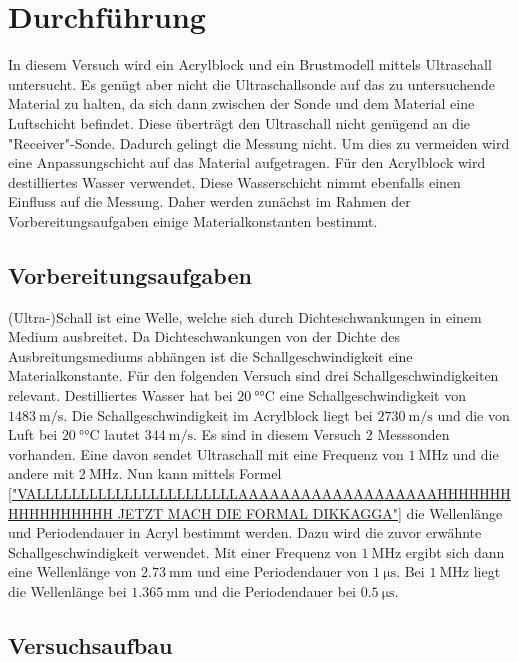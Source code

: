 \section{Durchführung}
\label{sec:Durchführung}
In diesem Versuch wird ein Acrylblock und ein Brustmodell mittels Ultraschall untersucht. Es genügt aber nicht die Ultraschallsonde auf das zu untersuchende Material zu halten, da sich dann
zwischen der Sonde und dem Material eine Luftschicht befindet. Diese überträgt den Ultraschall nicht genügend an die "Receiver"-Sonde. Dadurch gelingt die Messung nicht. Um dies zu vermeiden
wird eine Anpassungschicht auf das Material aufgetragen. Für den Acrylblock wird destilliertes Wasser verwendet. Diese Wasserschicht nimmt ebenfalls einen Einfluss auf die Messung. Daher werden
zunächst im Rahmen der Vorbereitungsaufgaben einige Materialkonstanten bestimmt.
\subsection{Vorbereitungsaufgaben}
\label{subsec:VBA}
(Ultra-)Schall ist eine Welle, welche sich durch Dichteschwankungen in einem Medium ausbreitet. Da Dichteschwankungen von der Dichte des Ausbreitungsmediums abhängen ist die Schallgeschwindigkeit
eine  Materialkonstante. Für den folgenden Versuch sind drei Schallgeschwindigkeiten relevant. Destilliertes Wasser hat bei $\qty{20}{\degree\celsius}$ eine Schallgeschwindigkeit von $\qty{1483}{\metre\per\second}$.
Die Schallgeschwindigkeit im Acrylblock liegt bei $\qty{2730}{\metre\per\second}$ und die von Luft bei $\qty{20}{\degree\celsius}$ lautet $\qty{344}{\metre\per\second}$.
Es sind in diesem Versuch 2 Messsonden vorhanden. Eine davon sendet Ultraschall mit eine Frequenz von $\qty{1}{\mega\hertz}$ und die andere mit $\qty{2}{\mega\hertz}$. Nun kann mittels Formel
\eqref{"VALLLLLLLLLLLLLLLLLLLLLLLAAAAAAAAAAAAAAAAAAAHHHHHHHHHHHHHHHHH JETZT MACH DIE FORMAL DIKKAGGA"} die Wellenlänge und Periodendauer in Acryl bestimmt werden. Dazu wird die zuvor erwähnte Schallgeschwindigkeit
verwendet. Mit einer Frequenz von $\qty{1}{\mega\hertz}$ ergibt sich dann eine Wellenlänge von $\qty{2.73}{\milli\metre}$ und eine Periodendauer von $\qty{1}{\micro\second}$. Bei $\qty{1}{\mega\hertz}$
liegt die Wellenlänge bei $\qty{1.365}{\milli\metre}$ und die Periodendauer bei $\qty{0.5}{\micro\second}$.
\subsection{Versuchsaufbau}
\label{subsec:versuchsaufbau}
